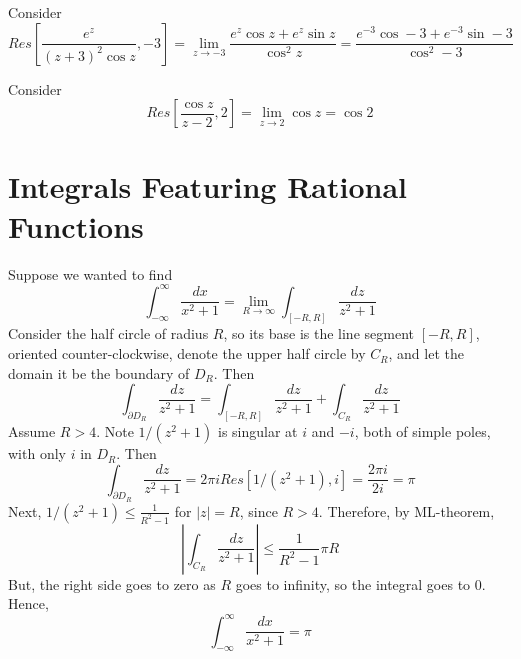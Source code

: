 \documentclass[12pt, a4paper, oneside, openright, titlepage]{book}
\begin{document}
\begin{eg}
    Consider \begin{equation*}
        Res\left[\frac{e^z}{(z+3)^2\cos z},-3\right] = \lim\limits_{z\rightarrow -3}\frac{e^z\cos z+e^z\sin z}{\cos^2z} = \frac{e^{-3}\cos -3 + e^{-3}\sin -3}{\cos^2-3}
    \end{equation*}
\end{eg}

\begin{eg}
    Consider \begin{equation*}
        Res\left[\frac{\cos z}{z-2},2\right] = \lim\limits_{z\rightarrow 2}\cos z = \cos 2
    \end{equation*}
\end{eg}


\section{Integrals Featuring Rational Functions}


\begin{cust}[Problem]
    Suppose we wanted to find $$\int_{-\infty}^{\infty}\frac{dx}{x^2+1} = \lim\limits_{R\rightarrow \infty}\int_{[-R,R]}\frac{dz}{z^2+1}$$ Consider the half circle of radius $R$, so its base is the line segment $[-R,R]$, oriented counter-clockwise, denote the upper half circle by $C_R$, and let the domain it be the boundary of $D_R$. Then \begin{equation*}
        \int_{\partial D_R}\frac{dz}{z^2+1} = \int_{[-R,R]}\frac{dz}{z^2+1}+\int_{C_R}\frac{dz}{z^2+1}
    \end{equation*}
    Assume $R > 4$. Note $1/(z^2+1)$ is singular at $i$ and $-i$, both of simple poles, with only $i$ in $D_R$. Then \begin{equation*}
        \int_{\partial D_R}\frac{dz}{z^2+1} = 2\pi iRes[1/(z^2+1),i] = \frac{2\pi i}{2i} = \pi
    \end{equation*}
    Next, $1/(z^2+1) \leq \frac{1}{R^2-1}$ for $|z| = R$, since $R > 4$. Therefore, by ML-theorem, \begin{equation*}
        \left|\int_{C_R}\frac{dz}{z^2+1}\right| \leq \frac{1}{R^2-1}\pi R
    \end{equation*}
    But, the right side goes to zero as $R$ goes to infinity, so the integral goes to $0$. Hence, \begin{equation*}
        \int_{-\infty}^{\infty}\frac{dx}{x^2+1} = \pi
    \end{equation*}
\end{cust}
\end{document}
